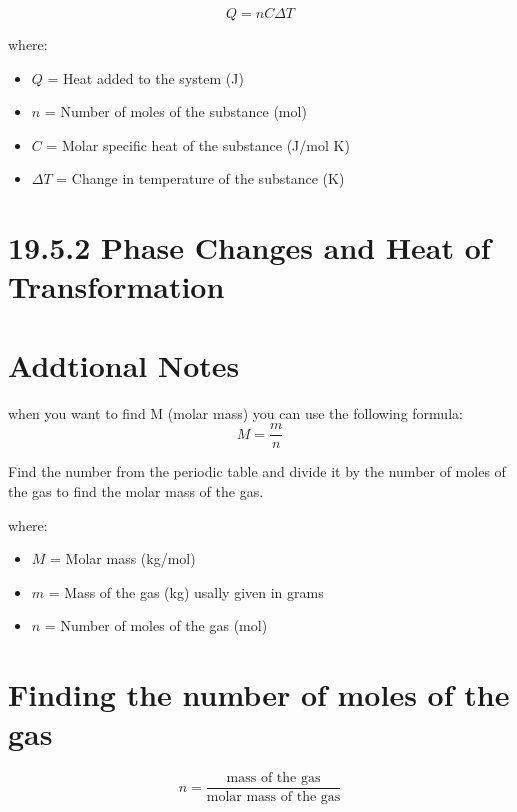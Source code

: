 \documentclass{article}
\begin{document}
\vspace{2cm}

\begin{equation}
    Q = nC \Delta T
\end{equation}

where:
\begin{itemize}
    \item $Q$ = Heat added to the system (J)
    \item $n$ = Number of moles of the substance (mol)
    \item $C$ = Molar specific heat of the substance (J/mol K)
    \item $\Delta T$ = Change in temperature of the substance (K)
\end{itemize}


\section*{19.5.2 Phase Changes and Heat of Transformation}



\section*{Addtional Notes}
when you want to find M (molar mass) you can use the following formula:
\begin{equation}
    M = \frac{m}{n}
\end{equation}

Find the number from the periodic table and divide it by the number of moles of the gas to find the molar mass of the gas.

where:
\begin{itemize}
    \item $M$ = Molar mass (kg/mol)
    \item $m$ = Mass of the gas (kg) usally given in grams
    \item $n$ = Number of moles of the gas (mol)
\end{itemize}


\section*{Finding the number of moles of the gas}
\begin{equation}
    n = \frac{\text{mass of the gas}}{\text{molar mass of the gas}}
\end{equation}
\end{document}
